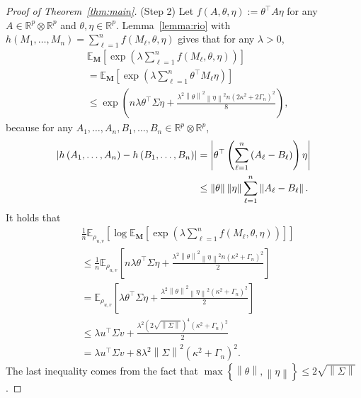 \documentclass[11pt,a4paper]{article}
\theoremstyle{remark}
\theoremstyle{definition}
\newcommand{\bc}{c}
\theoremstyle{definition}
\newcommand{\Ep}{\mathbb{E}}
\DeclarePairedDelimiter{\abs}{\lvert}{\rvert}
\DeclarePairedDelimiter{\bigabs}{\Bigg\lvert}{\Bigg\rvert}
\begin{document}
\begin{bibunit}[apalike]
\begin{proof}[Proof of Theorem~\ref{thm:main}]
(Step 2)
Let $f\left(A,\theta,\eta\right):=\theta^{\top}A\eta$ for any $A\in\mathbb{R}^{p}\otimes\mathbb{R}^{p}$ and $\theta,\eta\in\mathbb{R}^{p}$.
Lemma~\ref{lemma:rio} with $h(M_1,\dots,M_n) = \sum_{\ell=1}^n f(M_\ell,\theta,\eta)$ gives that for any $\lambda>0$,
\begin{align*}
    &\Ep_{\mathbf{M}}\left[\exp\left(\lambda\sum_{\ell=1}^{n}f\left(M_{\ell},\theta,\eta\right)\right)\right]\\
    &=\Ep_{\mathbf{M}}\left[\exp\left(\lambda\sum_{\ell=1}^{n}\theta^{\top}M_{\ell}\eta\right)\right]\\
    &\le \exp\left(n\lambda \theta^{\top}\Sigma \eta+\frac{\lambda^{2}\left\|\theta\right\|^{2}\left\|\eta\right\|^{2}{ n}\left(2\kappa^{2}+{ 2}\Gamma_{n}\right)^{2}}{{8}}\right),
    \end{align*}
because for any $A_{1},\ldots,A_{n},B_{1},\ldots,B_{n}\in\mathbb{R}^{p}\otimes\mathbb{R}^{p}$,
\begin{align*}
    \abs{h\left(A_{1},\dots,A_{n}\right)-h\left(B_{1},\dots,B_{n}\right)}&=\bigabs{\theta^{\top}\left(\sum_{\ell=1}^{n}\left(A_{\ell}-B_{\ell}\right)\right)\eta}\\
    &\le \left\|\theta\right\|\left\|\eta\right\|\sum_{\ell=1}^{n}\left\|A_{\ell}-B_{\ell}\right\|.
\end{align*}
It holds that
\begin{align*}
    &\frac{1}{n}\Ep_{\rho_{u,v}}\left[\log\Ep_{\mathbf{M}}\left[\exp\left(\lambda\sum_{\ell=1}^{n}f\left(M_{\ell},\theta,\eta\right)\right)\right]\right]\\
    &\le \frac{1}{n}\Ep_{\rho_{u,v}}\left[n\lambda \theta^{\top}\Sigma \eta+\frac{\lambda^{2}\left\|\theta\right\|^{2}\left\|\eta\right\|^{2}n\left(\kappa^{2}+\Gamma_{n}\right)^{2}}{2}\right]\\
    &=\Ep_{\rho_{u,v}}\left[\lambda \theta^{\top}\Sigma \eta+\frac{\lambda^{2}\left\|\theta\right\|^{2}\left\|\eta\right\|^{2}\left(\kappa^{2}+\Gamma_{n}\right)^{2}}{2}\right]\\
    &\le \lambda u^{\top}\Sigma v+\frac{\lambda^{2}\left(2\sqrt{\left\|\Sigma\right\|}\right)^{4}\left(\kappa^{2}+\Gamma_{n}\right)^{2}}{2}\\
    &=\lambda u^{\top}\Sigma v+8\lambda^{2}\left\|\Sigma\right\|^{2}\left(\kappa^{2}+\Gamma_{n}\right)^{2}.
\end{align*}
The last inequality comes from the fact that $\max\left\{\left\|\theta\right\|,\left\|\eta\right\|\right\}\le 2\sqrt{\left\|\Sigma\right\|}$.

\end{proof}
\end{bibunit}
\end{document}
